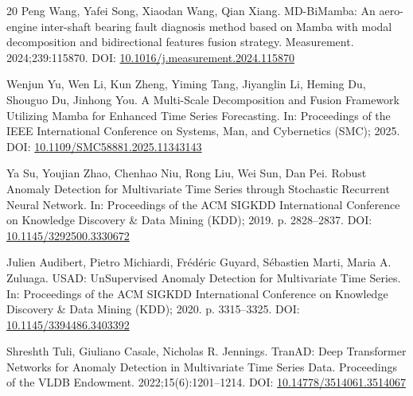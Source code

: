 \documentclass[cmes,article,submit,moreauthors,pdftex]{Definitions/tsp}
\begin{document}
\begin{thebibliography}{20}
Peng Wang, Yafei Song, Xiaodan Wang, Qian Xiang. MD-BiMamba: An aero-engine inter-shaft bearing fault diagnosis method based on Mamba with modal decomposition and bidirectional features fusion strategy. Measurement. 2024;239:115870. DOI: \href{https://doi.org/10.1016/j.measurement.2024.115870}{10.1016/j.measurement.2024.115870}

Wenjun Yu, Wen Li, Kun Zheng, Yiming Tang, Jiyanglin Li, Heming Du, Shouguo Du, Jinhong You. A Multi-Scale Decomposition and Fusion Framework Utilizing Mamba for Enhanced Time Series Forecasting. In: Proceedings of the IEEE International Conference on Systems, Man, and Cybernetics (SMC); 2025. DOI: \href{https://doi.org/10.1109/SMC58881.2025.11343143}{10.1109/SMC58881.2025.11343143}

Ya Su, Youjian Zhao, Chenhao Niu, Rong Liu, Wei Sun, Dan Pei. Robust Anomaly Detection for Multivariate Time Series through Stochastic Recurrent Neural Network. In: Proceedings of the ACM SIGKDD International Conference on Knowledge Discovery \& Data Mining (KDD); 2019. p. 2828--2837. DOI: \href{https://doi.org/10.1145/3292500.3330672}{10.1145/3292500.3330672}

Julien Audibert, Pietro Michiardi, Frédéric Guyard, Sébastien Marti, Maria A. Zuluaga. USAD: UnSupervised Anomaly Detection for Multivariate Time Series. In: Proceedings of the ACM SIGKDD International Conference on Knowledge Discovery \& Data Mining (KDD); 2020. p. 3315--3325. DOI: \href{https://doi.org/10.1145/3394486.3403392}{10.1145/3394486.3403392}

Shreshth Tuli, Giuliano Casale, Nicholas R. Jennings. TranAD: Deep Transformer Networks for Anomaly Detection in Multivariate Time Series Data. Proceedings of the VLDB Endowment. 2022;15(6):1201--1214. DOI: \href{https://doi.org/10.14778/3514061.3514067}{10.14778/3514061.3514067}

\end{thebibliography}
\end{document}
